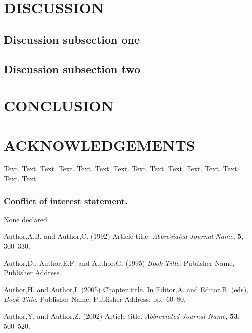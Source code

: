 \documentclass[a4,center,fleqn]{NAR}
\begin{document}
\section{DISCUSSION}

\subsection{Discussion subsection one}
\lipsum

\subsection{Discussion subsection two}
\lipsum

\section{CONCLUSION}
\lipsum

\section{ACKNOWLEDGEMENTS}

Text. Text. Text. Text. Text. Text. Text. Text. Text. Text. Text.
Text. Text. Text. Text.


\subsubsection{Conflict of interest statement.} None declared.
\newpage


\begin{thebibliography}{4}

Author,A.B. and Author,C. (1992)
Article title.
\textit{Abbreviated Journal Name}, \textbf{5}, 300--330.

Author,D., Author,E.F. and Author,G. (1995)
\textit{Book Title}.
Publisher Name, Publisher Address.

Author,H. and Author,I. (2005)
Chapter title.
In
Editor,A. and Editor,B. (eds),
\textit{Book Title},
Publisher Name, Publisher Address,
pp.\ 60--80.

Author,Y. and Author,Z. (2002)
Article title.
\textit{Abbreviated Journal Name}, \textbf{53}, 500--520.

\end{thebibliography}
\end{document}
